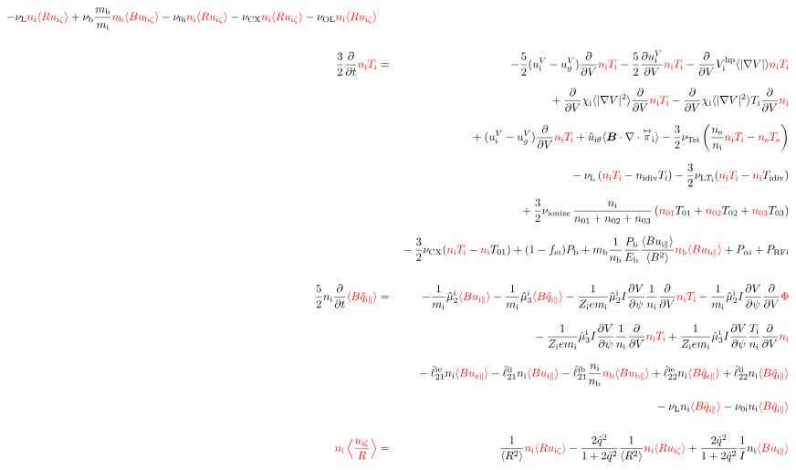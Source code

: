 \documentclass[11pt]{article}
\def\bvec#1{\leavevmode\hbox{\boldmath$#1$}}
\let\vec=\bvec
\def\r#1{{\rm#1}}
\def\ave#1{\left\langle#1\right\rangle}
\def\aves#1{\langle#1\rangle}
\def\dd#1#2{\frac{\partial #1}{\partial #2}}
\def\tensor#1{\mathord{\displaystyle\mathop{#1}^\leftrightarrow}}
\def\para{\parallel}
\def\ddV{\frac{\partial}{\partial V}}
\def\mi{m_\r{i}}
\def\mb{m_\r{b}}
\def\nee{n_\r{e}}
\def\ni{n_\r{i}}
\def\nb{n_\r{b}}
\def\nna{n_{01}}
\def\nnb{n_{02}}
\def\nnc{n_{03}}
\def\Te{T_\r{e}}
\def\Ti{T_\r{i}}
\def\Zi{Z_\r{i}}
\def\Pb{P_\r{b}}
\def\Eb{E_\r{b}}
\def\uizt{u_{\r{i}\zeta}}
\def\ubzt{u_{\r{b}\zeta}}
\def\uepara{u_{\r{e}\para}}
\def\uipara{u_{\r{i}\para}}
\def\ubpara{u_{\r{b}\para}}
\def\qipara{q_{\r{i}\para}}
\def\qhatepara{\hat{q}_{\r{e}\para}}
\def\qhatipara{\hat{q}_{\r{i}\para}}
\def\uiV{u_\r{i}^V}
\def\ugV{u_{g}^V}
\def\chii{\chi_\r{i}}
\def\ddt{\frac{\partial}{\partial t}}
\def\PRFi{P_\r{RFi}}
\def\Tna{T_{01}}
\def\Tnb{T_{02}}
\def\Tnc{T_{03}}
\def\fei{f_\r{ei}}
\def\Palpi{P_{\alpha\r{i}}}
\def\nuni{\nu_\r{0i}}
\def\nuL{\nu_\r{L}}
\def\nuCX{\nu_\r{CX}}
\def\nuion{\nu_\r{ionize}}
\def\nub{\nu_\r{b}}
\def\nidiv{n_\r{idiv}}
\def\Tidiv{T_\r{idiv}}
\def\nuLTi{\nu_{\r{L}T_\r{i}}}
\def\nuOL{\nu_\r{OL}}
\def\red#1{\textcolor{red}{#1}}
\begin{document}
\begin{eqnarray}
%
  - \nuL  \red{\ni \aves{R \uizt}}
%
  + \nub  \frac{\mb}{\mi} \red{\nb \aves{B \ubzt}}
%
  - \nuni \red{\ni \aves{R \uizt}}
%
  - \nuCX \red{\ni \aves{R \uizt}}
%
  - \nuOL \red{\ni \aves{R \uizt}}
\\[5mm]
  \frac{3}{2} \ddt \red{\ni \Ti}  &=& 
%
  - \frac{5}{2} ( \uiV - \ugV ) \ddV \red{\ni \Ti}
%
  - \frac{5}{2} \dd{\uiV}{V} \red{\ni \Ti}
%
  - \ddV V_\r{i}^\r{hp} \aves{|\nabla V|} \red{\ni \Ti}
\nonumber\\[2.5mm]&&{}
  + \ddV \chii \aves{|\nabla V|^2} \ddV \red{\ni \Ti}
  - \ddV \chii \aves{|\nabla V|^2} \Ti \ddV \red{\ni}
\nonumber\\[2.5mm]&&{}
%
  + ( \uiV - \ugV ) \ddV \red{\ni \Ti}
%
  + \hat{u}_{\r{i}\theta} \aves{\vec{B}\cdot\nabla\cdot\tensor{\pi}_\r{i}}
%
  - \frac{3}{2} \nu_\r{Tei} \left(\frac{\nee}{\ni} \red{\ni \Ti} - \red{\nee \Te} \right)
\nonumber\\[2.5mm]&&{}
%
  - \nuL \left(\red{\ni \Ti}  - \nidiv \Ti \right)
%
  - \frac{3}{2} \nuLTi (\red{\ni \Ti} - \red{\ni} \Tidiv)
%
\nonumber\\[2.5mm]&&{}
  + \frac{3}{2} \nuion\, \frac{\ni}{\nna + \nnb + \nnc}\, (\red{\nna} \Tna +
  \red{\nnb} \Tnb + \red{\nnc} \Tnc)
\nonumber\\[2.5mm]&&{}
%
  - \frac{3}{2} \nuCX (\red{\ni \Ti} - \red{\ni} \Tna)
%
  + (1 - \fei) \Pb
%
  + \mb \frac{1}{\nb} \frac{\Pb}{\Eb} \frac{\aves{B
  \uipara}}{\aves{B^2}} \red{\nb \aves{B \ubpara}}
%
  + \Palpi
%
  + \PRFi
\\[5mm]
 \frac{5}{2} \ni \ddt \red{\aves{B \qhatipara}} &=&
%
  - \frac{1}{\mi} \hat{\mu}_2^\r{i} \red{\aves{B \uipara}}
  - \frac{1}{\mi} \hat{\mu}_3^\r{i} \red{\aves{B \qhatipara}}
%
  - \frac{1}{\Zi e\mi} \hat{\mu}_2^\r{i} I \dd{V}{\psi} \frac{1}{\ni}
  \ddV \red{\ni\Ti}
  - \frac{1}{\mi} \hat{\mu}_2^\r{i} I \dd{V}{\psi} \ddV \red{\Phi}
\nonumber\\[3mm]&&{}
%
  - \frac{1}{\Zi e\mi} \hat{\mu}_3^\r{i} I \dd{V}{\psi} \frac{1}{\ni}
  \ddV \red{\ni\Ti}
  + \frac{1}{\Zi e\mi} \hat{\mu}_3^\r{i} I \dd{V}{\psi} \frac{\Ti}{\ni}
  \ddV \red{\ni}
\nonumber\\[3mm]&&{}
%
  - \hat{\ell}_{21}^{\r{ie}} \ni \red{\aves{B \uepara}} 
  - \hat{\ell}_{21}^{\r{ii}} \ni \red{\aves{B \uipara}} 
  - \hat{\ell}_{21}^{\r{ib}} \frac{\ni}{\nb} \red{\nb \aves{B \ubpara}} 
%
  + \hat{\ell}_{22}^{\r{ie}} \ni \red{\aves{B \qhatepara}} 
  + \hat{\ell}_{22}^{\r{ii}} \ni \red{\aves{B \qhatipara}} 
\nonumber\\[3mm]&&{}
%
  - \nuL \ni \red{\aves{B \qhatipara}}
%
  - \nuni \ni \red{\aves{B \qhatipara}}
\\[5mm]
    \red{\ni \ave{\frac{\uizt}{R}}} &=&
%
    \frac{1}{\aves{R^2}} \red{\ni \aves{R\uizt}}
%
  - \frac{2\hat{q}^2}{1+2\hat{q}^2} \frac{1}{\aves{R^2}}\red{\ni\aves{R\uizt}}
%
  + \frac{2\hat{q}^2}{1+2\hat{q}^2} \frac{1}{I}\ni \red{\aves{B\uipara}}
\end{eqnarray}
\end{document}
